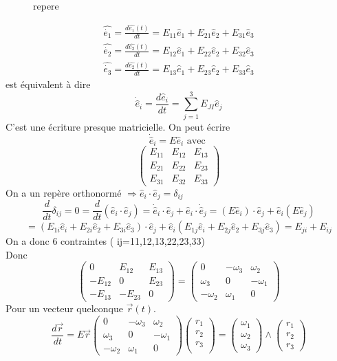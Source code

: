\documentclass[../main.tex]{subfiles}
\begin{document}
\begin{figure}[ht]
    \centering
    \caption{repere}
    \label{fig:repere}
\end{figure}
\begin{align*}
	\hat{\dot{e_1}} = \frac{d\hat{e_1}(t)}{dt} = E_{11} \hat{e}_1 + E_{21} \hat{e}_2 + E_{31} \hat{e}_3\\
	\hat{\dot{e_2}} = \frac{d\hat{e_2}(t)}{dt} = E_{12} \hat{e}_1 + E_{22} \hat{e}_2 + E_{32} \hat{e}_3\\
	\hat{\dot{e_3}} = \frac{d\hat{e_2}(t)}{dt} = E_{13} \hat{e}_1 + E_{23} \hat{e}_2 + E_{33} \hat{e}_3
\end{align*}
est équivalent à dire
\[ 
\dot{ \hat{e} }_i = \frac{d \hat{e}_i}{dt} = \sum_{j=1}^{ 3}E_{JI} \hat{e}_j
\]
C'est une écriture presque matricielle.
On peut écrire
\[ 
\dot{ \hat{e} }_i = E \hat{e}_i \text{ avec } 
\]
\[ 
\begin{pmatrix}
	E_{11} & E_{12} & E_{13}\\
	E_{21} & E_{22} & E_{23}\\
	E_{31} & E_{32} & E_{33}
\end{pmatrix}
\]
On a un repère orthonormé $\Rightarrow \hat{e}_i \cdot \hat{e}_j = \delta_{ij}$ 
\[ 
	\frac{d}{dt} \delta_{ij} =0 = \frac{d}{dt} ( \hat{e}_i \cdot \hat{e}_j) = \dot{\hat{e}}_i\cdot \hat{e}_j +\hat{e}_i \cdot \dot{\hat{e}} _j= ( E \hat{e}_i) \cdot \hat{e}_j + \hat{e}_i ( E \hat{e}_j)
\]
\[ 
	=(E_{1i}  \hat{e}_i + E_{2i} \hat{e}_2 + E_{3i} \hat{e}_3) \cdot \hat{e}_j + \hat{e}_i(E_{1j}  \hat{e}_i + E_{2j} \hat{e}_2 + E_{3j} \hat{e}_3) = E_{ji} + E_{ij} 
\]
On a donc 6 contraintes ( ij=11,12,13,22,23,33)\\
Donc 
 \[ 
\begin{pmatrix}
	0 & E_{12} & E_{13} \\
	- E_{12} & 0 & E_{23}\\
	-E_{13} & - E_{23} & 0
\end{pmatrix}
=
\begin{pmatrix}
	0 & - \omega_3 & \omega_2\\
	\omega_3 & 0 & - \omega_1\\
	- \omega_2 & \omega_1 & 0
\end{pmatrix}
\]
Pour un vecteur quelconque $\vec{r}(t)$.
\[ 
\frac{d \vec{r}}{dt} = E \vec{r}
\begin{pmatrix}
	0 & - \omega_3 & \omega_2\\
	\omega_3 & 0 & - \omega_1\\
	- \omega_2 & \omega_1 & 0
\end{pmatrix}
\begin{pmatrix}
r_1\\
r_2\\
r_3\\
\end{pmatrix}
=
\begin{pmatrix}
\omega_1\\
\omega_2\\
\omega_3
\end{pmatrix}
\land
\begin{pmatrix}
r_1\\
r_2\\
r_3
\end{pmatrix}
\]
\end{document}
